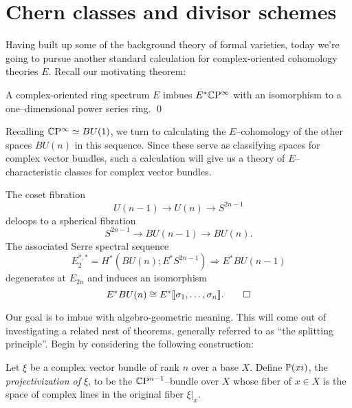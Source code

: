







\section{Chern classes and divisor schemes}

Having built up some of the background theory of formal varieties, today we're going to pursue another standard calculation for complex-oriented cohomology theories $E$.  Recall our motivating theorem:
\begin{corollary}
A complex-oriented ring spectrum $E$ imbues $E^* \CP^\infty$ with an isomorphism to a one--dimensional power series ring. \qed
\end{corollary}

\noindent Recalling $\CP^\infty \simeq BU(1)$, we turn to calculating the $E$--cohomology of the other spaces $BU(n)$ in this sequence.  Since these serve as classifying spaces for complex vector bundles, such a calculation will give us a theory of $E$--characteristic classes for complex vector bundles.

\begin{lemma}\label{ECohomologyOfBUn}
The coset fibration \[U(n-1) \to U(n) \to S^{2n-1}\] deloops to a spherical fibration \[S^{2n-1} \to BU(n-1) \to BU(n).\]  The associated Serre spectral sequence \[E_2^{*, *} = H^*(BU(n); E^* S^{2n-1}) \Rightarrow E^* BU(n-1)\] degenerates at $E_{2n}$ and induces an isomorphism \[E^* BU(n) \cong E^* \llbracket \sigma_1, \ldots, \sigma_n\rrbracket. \qed\]
\end{lemma}

Our goal is to imbue  with algebro-geometric meaning.  This will come out of investigating a related nest of theorems, generally referred to as ``the splitting principle''.  Begin by considering the following construction:
\begin{definition}
Let $\xi$ be a complex vector bundle of rank $n$ over a base $X$.  Define $\P(xi)$, the \textit{projectivization of $\xi$}, to be the $\CP^{n-1}$--bundle over $X$ whose fiber of $x \in X$ is the space of complex lines in the original fiber $\xi|_x$.
\end{definition}

